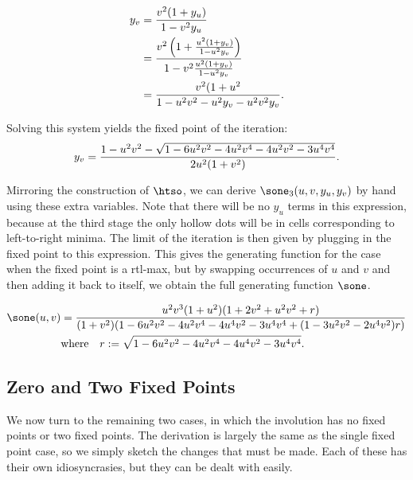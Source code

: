\documentclass[12pt,twoside]{memoir}
\begin{document}
      $$ \begin{aligned} 
          y_v &=  \frac{v^2 (1 + y_u)}{1 - v^2 y_u} \\
          &= \frac{v^2 \left(1 + \frac{u^2 (1 + y_v)}{1 - u^2 y_v}\right)}{%
            1-v^2 \frac{u^2 (1 + y_v)}{1 - u^2 y_v}} \\
          &= \frac{v^2 (1 + u^2}{%
              1 - u^2v^2 - u^2y_v - u^2v^2y_v}. 
      \end{aligned} $$

      Solving this system yields the fixed point of the iteration: 
      \begin{equation} \label{involutions:eqn:dualfixed}
        y_v = \frac{1 - u^2v^2 - \sqrt{1 - 6u^2v^2 - 4u^2v^4 - 
                                       4u^2v^2 - 3u^4v^4}}{%
                    2u^2(1+v^2)}.
      \end{equation}

      Mirroring the construction of $\htso$, we can derive
      $\sone_3(u,v,y_u, y_v)$ by hand using these extra variables. Note that
      there will be no $y_u$ terms in this expression, because at the third stage
      the only hollow dots will be in cells corresponding to left-to-right
      minima. The limit of the iteration is then given by plugging in the fixed
      point to this expression. This gives the generating function for the case
      when the fixed point is a rtl-max, but by swapping occurrences of $u$ and
      $v$ and then adding it back to itself, we obtain the full generating
      function $\sone$. 

      {\small
      \begin{equation} \label{involutions:eqn:sone}
        \begin{split}
        \sone(u,v) &= 
          \frac{u^2v^3(1+u^2)(1+2v^2+u^2v^2+r)}
          {(1+v^2)(1-6u^2v^2-4u^2v^4-4u^4v^2-3u^4v^4+(1-3u^2v^2-2u^4v^2)r)}\\
          &\text{where} \quad r := \sqrt{1-6u^2v^2-4u^2v^4-4u^4v^2-3u^4v^4}.
        \end{split}
      \end{equation}
      }


    \subsection{Zero and Two Fixed Points}
    \label{involutions:sub:02fp}
      
      We now turn to the remaining two cases, in which the involution has no
      fixed points or two fixed points. The derivation is largely the same as the
      single fixed point case, so we simply sketch the changes that must be made. 
      Each of these has their own idiosyncrasies, but they can be dealt with
      easily. 
\end{document}
